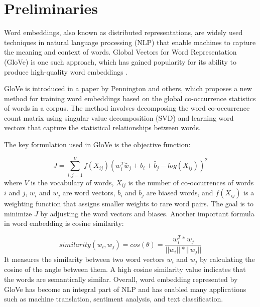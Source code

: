 \documentclass[conference]{IEEEtran}
\begin{document}

\section{Preliminaries}
Word embeddings, also known as distributed representations, are widely
used techniques in natural language processing (NLP) that enable
machines to capture the meaning and context of words. Global Vectors for
Word Representation (GloVe) is one such approach, which has gained
popularity for its ability to produce high-quality word embeddings \cite{8861084}.

GloVe is introduced in a paper by Pennington and others, which proposes a new method for training word
embeddings based on the global co-occurrence statistics of words in a
corpus. The method involves decomposing the word co-occurrence count
matrix using singular value decomposition (SVD) and learning word
vectors that capture the statistical relationships between words.

The key formulation used in GloVe is the objective function:

\begin{equation}\label{eq:J}
    J = \sum_{i,j=1}^{V}f(X_{ij})(w_i^T \tilde{w_j} + b_i + \tilde{b_j} - log(X_{ij}))^2
\end{equation}
where \(V\) is the vocabulary of words, \(X_{ij}\) is the number of
co-occurrences of words \(i\) and \(j\), \(w_i\) and \(w_j\) are word
vectors, \(b_i\) and \(b_j\) are biased words, and \(f(X_{ij})\) is a
weighting function that assigns smaller weights to rare word pairs. The
goal is to minimize \(J\) by adjusting the word vectors and biases.
Another important formula in word embedding is cosine similarity:

\begin{equation}\label{eq:similarity}
    similarity(w_i, w_j) = cos(\theta) = \frac{w_i^T * w_j}{||w_i|| * ||w_j||}
\end{equation}
It measures the similarity between two word vectors \(w_i\) and \(w_j\)
by calculating the cosine of the angle between them. A high cosine
similarity value indicates that the words are semantically similar.
Overall, word embedding represented by GloVe has become an integral part
of NLP and has enabled many applications such as machine translation,
sentiment analysis, and text classification.
\end{document}
